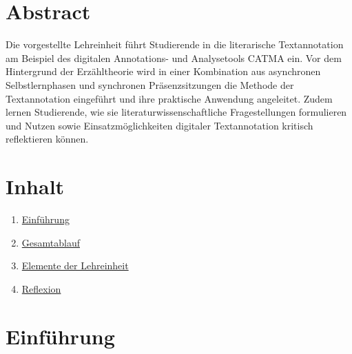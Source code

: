 \documentclass[
          a4paper,
        ]{article}
\providecommand{\tightlist}{%
  \setlength{\itemsep}{0pt}\setlength{\parskip}{0pt}}
\begin{document}
\pagestyle{plain}


\maketitle














\pagestyle{page}

\renewcommand{\arraystretch}{3}  %

\section{Abstract}\label{abstract}

Die vorgestellte Lehreinheit führt Studierende in die literarische
Textannotation am Beispiel des digitalen Annotations- und Analysetools
CATMA ein. Vor dem Hintergrund der Erzähltheorie wird in einer
Kombination aus asynchronen Selbstlernphasen und synchronen
Präsenzsitzungen die Methode der Textannotation eingeführt und ihre
praktische Anwendung angeleitet. Zudem lernen Studierende, wie sie
literaturwissenschaftliche Fragestellungen formulieren und Nutzen sowie
Einsatzmöglichkeiten digitaler Textannotation kritisch reflektieren
können.

\section{Inhalt}\label{inhalt}

\begin{enumerate}
\def\labelenumi{\arabic{enumi}.}
\tightlist
\item
  \hyperref[einfuxfchrung]{Einführung}
\item
  \hyperref[gesamtablauf]{Gesamtablauf}
\item
  \hyperref[elemente-der-lehreinheit]{Elemente der Lehreinheit}
\item
  \hyperref[reflexion]{Reflexion}
\end{enumerate}

\section{Einführung}\label{einfuxfchrung}
\end{document}
